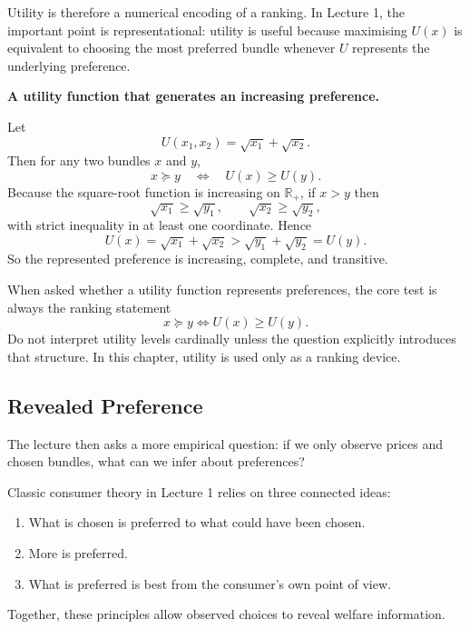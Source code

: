 Utility is therefore a numerical encoding of a ranking. In Lecture 1, the important point is representational: utility is useful because maximising $U(x)$ is equivalent to choosing the most preferred bundle whenever $U$ represents the underlying preference.

\begin{examplebox}
\textbf{A utility function that generates an increasing preference.}

Let
\[
U(x_1,x_2)=\sqrt{x_1}+\sqrt{x_2}.
\]
Then for any two bundles $x$ and $y$,
\[
x \succeq y \quad \Longleftrightarrow \quad U(x) \ge U(y).
\]
Because the square-root function is increasing on $\mathbb{R}_+$, if $x > y$ then
\[
\sqrt{x_1} \ge \sqrt{y_1}, \qquad \sqrt{x_2} \ge \sqrt{y_2},
\]
with strict inequality in at least one coordinate. Hence
\[
U(x)=\sqrt{x_1}+\sqrt{x_2} > \sqrt{y_1}+\sqrt{y_2}=U(y).
\]
So the represented preference is increasing, complete, and transitive.
\end{examplebox}

\begin{examtip}
When asked whether a utility function represents preferences, the core test is always the ranking statement
\[
x \succeq y \iff U(x) \ge U(y).
\]
Do not interpret utility levels cardinally unless the question explicitly introduces that structure. In this chapter, utility is used only as a ranking device.
\end{examtip}

\subsection{Revealed Preference}

The lecture then asks a more empirical question: if we only observe prices and chosen bundles, what can we infer about preferences?

\begin{examtip}[title={Core Principles Behind Revealed Preference}]
Classic consumer theory in Lecture 1 relies on three connected ideas:
\begin{enumerate}
    \item What is chosen is preferred to what could have been chosen.
    \item More is preferred.
    \item What is preferred is best from the consumer's own point of view.
\end{enumerate}
Together, these principles allow observed choices to reveal welfare information.
\end{examtip}

